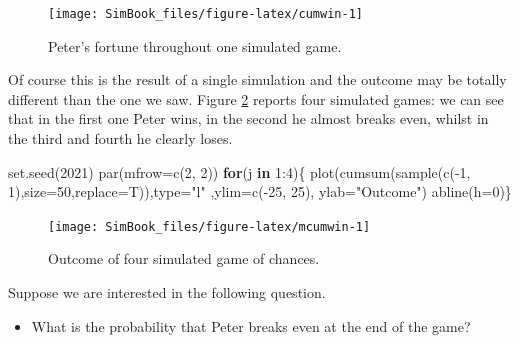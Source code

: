 \documentclass[
]{book}
\newenvironment{Shaded}{\begin{snugshade}}{\end{snugshade}}
\newcommand{\AttributeTok}[1]{\textcolor[rgb]{0.77,0.63,0.00}{#1}}
\newcommand{\ControlFlowTok}[1]{\textcolor[rgb]{0.13,0.29,0.53}{\textbf{#1}}}
\newcommand{\DecValTok}[1]{\textcolor[rgb]{0.00,0.00,0.81}{#1}}
\newcommand{\FunctionTok}[1]{\textcolor[rgb]{0.00,0.00,0.00}{#1}}
\newcommand{\NormalTok}[1]{#1}
\newcommand{\SpecialCharTok}[1]{\textcolor[rgb]{0.00,0.00,0.00}{#1}}
\newcommand{\StringTok}[1]{\textcolor[rgb]{0.31,0.60,0.02}{#1}}
\providecommand{\tightlist}{%
  \setlength{\itemsep}{0pt}\setlength{\parskip}{0pt}}
\begin{document}
\begin{figure}

{\centering \texttt{[image: SimBook\_files/figure-latex/cumwin-1]} 

}

\caption{Peter's fortune throughout one simulated game.}\label{fig:cumwin}
\end{figure}

Of course this is the result of a single simulation and the outcome may be totally different than the one we saw. Figure \ref{fig:mcumwin} reports four simulated games: we can see that in the first one Peter wins, in the second he almost breaks even, whilst in the third and fourth he clearly loses.

\begin{Shaded}
\begin{Highlighting}[]
\FunctionTok{set.seed}\NormalTok{(}\DecValTok{2021}\NormalTok{)}
\FunctionTok{par}\NormalTok{(}\AttributeTok{mfrow=}\FunctionTok{c}\NormalTok{(}\DecValTok{2}\NormalTok{, }\DecValTok{2}\NormalTok{))}
\ControlFlowTok{for}\NormalTok{(j }\ControlFlowTok{in} \DecValTok{1}\SpecialCharTok{:}\DecValTok{4}\NormalTok{)\{}
  \FunctionTok{plot}\NormalTok{(}\FunctionTok{cumsum}\NormalTok{(}\FunctionTok{sample}\NormalTok{(}\FunctionTok{c}\NormalTok{(}\SpecialCharTok{{-}}\DecValTok{1}\NormalTok{, }\DecValTok{1}\NormalTok{),}\AttributeTok{size=}\DecValTok{50}\NormalTok{,}\AttributeTok{replace=}\NormalTok{T)),}\AttributeTok{type=}\StringTok{"l"}\NormalTok{ ,}\AttributeTok{ylim=}\FunctionTok{c}\NormalTok{(}\SpecialCharTok{{-}}\DecValTok{25}\NormalTok{, }\DecValTok{25}\NormalTok{), }\AttributeTok{ylab=}\StringTok{"Outcome"}\NormalTok{)}
  \FunctionTok{abline}\NormalTok{(}\AttributeTok{h=}\DecValTok{0}\NormalTok{)\}}
\end{Highlighting}
\end{Shaded}

\begin{figure}

{\centering \texttt{[image: SimBook\_files/figure-latex/mcumwin-1]} 

}

\caption{Outcome of four simulated game of chances.}\label{fig:mcumwin}
\end{figure}

Suppose we are interested in the following question.

\begin{itemize}
\tightlist
\item
  What is the probability that Peter breaks even at the end of the game?
\end{itemize}
\end{document}
